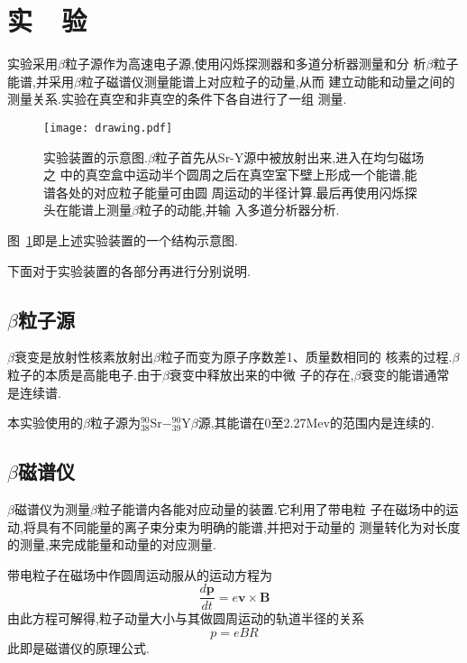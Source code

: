 \documentclass[aps,pre,12pt,preprint,onecolumn,showpacs,showkeys]{revtex4-1}
\begin{document}
\section{实~~验}

实验采用$\beta$粒子源作为高速电子源,使用闪烁探测器和多道分析器测量和分
析$\beta$粒子能谱,并采用$\beta$粒子磁谱仪测量能谱上对应粒子的动量,从而
建立动能和动量之间的测量关系.实验在真空和非真空的条件下各自进行了一组
测量.

\begin{figure}[htbp]
  \centering
\texttt{[image: drawing.pdf]}
\caption{\label{fig:ins}%
实验装置的示意图.$\beta$粒子首先从Sr-Y源中被放射出来,进入在均匀磁场之%
中的真空盒中运动半个圆周之后在真空室下壁上形成一个能谱,能谱各处的对应粒子能量可由圆%
周运动的半径计算.最后再使用闪烁探头在能谱上测量$\beta$粒子的动能,并输%
入多道分析器分析.}
\end{figure}

图~\ref{fig:ins}即是上述实验装置的一个结构示意图.

下面对于实验装置的各部分再进行分别说明.

\subsection{$\beta$粒子源}

$\beta$衰变是放射性核素放射出$\beta$粒子而变为原子序数差1、质量数相同的
核素的过程.$\beta$粒子的本质是高能电子.由于$\beta$衰变中释放出来的中微
子的存在,$\beta$衰变的能谱通常是连续谱.

本实验使用的$\beta$粒子源为$^{90}_{38}\text{Sr} -
^{90}_{39}\text{Y}\beta$源,其能谱在0至2.27Mev的范围内是连续的.\cite{Book}

\subsection{$\beta$磁谱仪}

$\beta$磁谱仪为测量$\beta$粒子能谱内各能对应动量的装置.它利用了带电粒
子在磁场中的运动,将具有不同能量的离子束分束为明确的能谱,并把对于动量的
测量转化为对长度的测量,来完成能量和动量的对应测量.

带电粒子在磁场中作圆周运动服从的运动方程为
\begin{equation}
  \label{eq:Beq}
  \frac{d\bm{p}}{dt} = e\bm{v}\times\bm{B}
\end{equation}
由此方程可解得,粒子动量大小与其做圆周运动的轨道半径的关系
\begin{equation}
  \label{eq:p-R}
  p = eBR
\end{equation}
此即是磁谱仪的原理公式.
\end{document}
